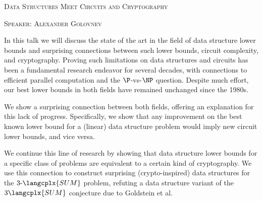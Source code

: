 \begin{center}
    \textsc{Data Structures Meet Circuits and Cryptography}

    \textsc{Speaker: Alexander Golovnev}
\end{center}



In this talk we will discuss the state of the art in the field of data structure lower bounds and
surprising connections between such lower bounds, circuit complexity, and cryptography. Proving such
limitations on data structures and circuits has been a fundamental research endeavor for several decades,
with connections to efficient parallel computation and the $\P$-vs-$\NP$ question. Despite much effort,
our best lower bounds in both fields have remained unchanged since the 1980s.

We show a surprising connection between both fields, offering an explanation for this lack of
progress. Specifically, we show that any improvement on the best known lower bound for a (linear) data
structure problem would imply new circuit lower bounds, and vice versa.

We continue this line of research by showing that data structure lower bounds for a specific class of
problems are equivalent to a certain kind of cryptography. We use this connection to construct surprising
(crypto-inspired) data structures for the $3\text{-}\langcplx{SUM}$ problem, refuting a data structure
variant of the $3\langcplx{SUM}$ conjecture due to Goldstein et al.